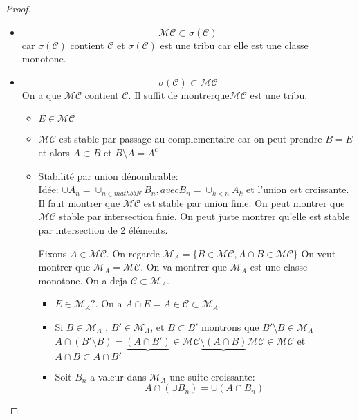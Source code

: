 \begin{proof}
	\begin{itemize}
		\item
		      $$ \mathscr{M}\mathscr{C} \subset \sigma(\mathscr{C}) $$
		      car $\sigma(\mathscr{C})$ contient $\mathscr{C}$ et $\sigma(\mathscr{C}) $ est une
		      tribu car elle est une classe monotone.
		\item
		      $$\sigma(\mathscr{C})  \subset \mathscr{M}\mathscr{C}$$
		      On a  que $\mathscr{M}\mathscr{C}$ contient $\mathscr{C}$. Il
		      suffit de montrerque$\mathscr{M}\mathscr{C}$ est une tribu. \\

		      \begin{itemize}
			      \item $E \in \mathscr{M}\mathscr{C}$
			      \item  $\mathscr{M}\mathscr{C}$ est stable par passage au complementaire car
			            on peut prendre $B = E$ et alors $A \subset B$ et $B\setminus A = A^c$
			      \item Stabilité par union dénombrable: \\

			            Idée: $\cup A_n = \cup_{n\in mathbb{N}} B_n, avec B_n = \cup_{k<n} A_k$ et l'union est croissante.
			            Il faut montrer que $\mathscr{M}\mathscr{C}$ est stable par union finie.
			            On peut montrer que $\mathscr{M}\mathscr{C}$ stable par intersection finie. On peut juste montrer qu'elle est stable par intersection de 2 éléments.

			            Fixons $A \in \mathscr{M}\mathscr{C}$. On regarde $\mathscr{M}_A = \{B \in \mathscr{M}\mathscr{C} , A \cap B \in \mathscr{M}\mathscr{C}\}$
			            On veut montrer que $\mathscr{M}_A = \mathscr{M}\mathscr{C}$.
			            On va montrer que $\mathscr{M}_A$ est une classe monotone. On a deja $\mathscr{C} \subset \mathscr{M}_A$.
			            \begin{itemize}
				            \item $E \in \mathscr{M}_A ?$.  On a $A \cap E = A \in \mathscr{C} \subset \mathscr{M}_A$
				            \item Si $B \in \mathscr{M}_A$ , $B' \in \mathscr{M}_A$, et $B \subset B'$ montrons que $B'\setminus B \in \mathscr{M}_A$
				                  $A \cap (B'\setminus B) = \underbrace{(A \cap B')}{\in   \mathscr{M}\mathscr{C}} \underbrace{\setminus (A\cap B)}{\mathscr{M}\mathscr{C}} \in \mathscr{M}\mathscr{C}$
				                  et $A\cap B \subset A \cap B'$
				            \item Soit $B_n$ a valeur dans $\mathscr{M}_A$ une suite croissante:
				                  $$ A \cap (\cup B_n) = \cup (A \cap B_n)$$


\end{itemize}
\end{itemize}
\end{itemize}
\end{proof}
